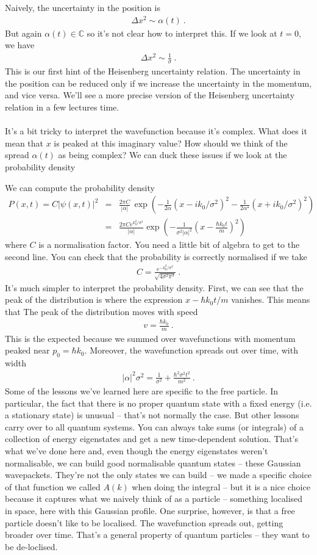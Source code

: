 \documentclass[12pt]{article}
\def\be{\begin{eqnarray}}
\def\ee{\end{eqnarray}}
\newcommand{\nn}{\nonumber}
\newcommand\para{\paragraph{}}
\newcommand{\C}{{\mathds C}}
\begin{document}
{\color{olive} Naively, the uncertainty in the position is
%
\be \Delta x^2 \sim \alpha(t) \ .\ee
%
But again $\alpha(t)\in\C$ so it's not clear how to interpret this. If we look at $t=0$, we have
%
\be \Delta x^2 \sim \frac{1}{\sigma}\ .\ee
%
This is our first hint of the Heisenberg uncertainty relation. The uncertainty in the position can be reduced only if we increase the uncertainty in the momentum, and vice versa.} We'll see a more precise version of the Heisenberg uncertainty relation in a few lectures time. 


\para
It's a bit tricky to interpret the wavefunction because it's complex. What does it mean that $x$ is peaked at this imaginary value? How should we think of the spread $\alpha(t)$ as being complex? We can duck these issues if we look at the probability density

{\color{olive} We can compute the probability density
%
\be P(x,t) = C|\psi(x,t)|^2 &=& \frac{2\pi C}{|\alpha|} \,\exp\left(-\frac{1}{2\alpha}( x -ik_0/\sigma^2)^2 -\frac{1}{2\alpha^\star}(x +ik_0/\sigma^2)^2 \right)\nn\\ &=&  
\frac{2\pi C e^{k_0^2/\sigma^2}}{|\alpha|} \exp\left(-\frac{1}{\sigma^2|\alpha|^2}\left(x-\frac{\hbar k_0t}{m}\right)^2\right)\nn\ee
%
where $C$ is a normalisation factor. } You need a little bit of algebra to get to the second line. {\color{olive}You can check that the probability is correctly normalised if we take 
%
\be C = \frac{e^{-k_0^2/\sigma^2}}{\sqrt{4\sigma^2 \pi^{3}}} \ .\ee
%
}
It's much simpler to interpret the probability density. First, we can see that the peak of the distribution is where the expression  $x-\hbar k_0t/m$ vanishes. This means that
%
{\color{olive} The peak of the distribution moves with speed
%
\be v = \frac{\hbar k_0}{m}\ .\ee
%
This is the expected because we summed over wavefunctions with momentum peaked near $p_0=\hbar k_0$. Moreover, the wavefunction spreads out over time, with width
%
\be |\alpha|^2\sigma^2 = \frac{1}{\sigma^2} + \frac{\hbar^2\sigma^2t^2}{m^2}\ .\nn\ee
%
}
Some of the lessons we've learned here are specific to the free particle. In particular, the fact that there is no proper quantum state with a fixed energy (i.e. a stationary state) is unusual -- that's not normally the case. But other lessons carry over to all quantum systems. You can always take sums (or integrals) of a collection of energy eigenstates and get a new time-dependent solution. That's what we've done here and, even though the energy eigenstates weren't normalisable, we can build good normalisable quantum states -- these Gaussian wavepackets. They're not the only states we can build -- we made a specific choice of that function we called $A(k)$ when doing the integral -- but it is a nice choice because it captures what we naively think of as a particle -- something localised in space, here with this Gaussian profile. One surprise, however, is that a free particle doesn't like to be localised. The wavefunction spreads out, getting broader over time. That's a general property of quantum particles -- they want to be de-loclised.
\end{document}
